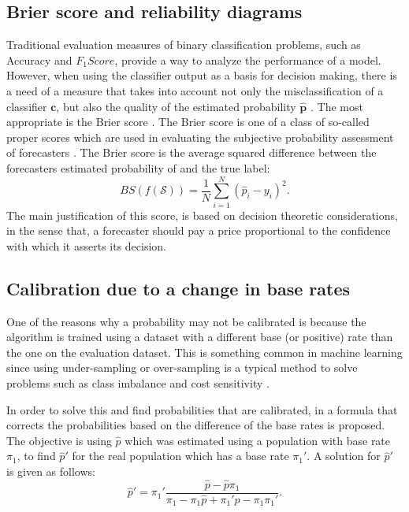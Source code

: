   
\subsection{Brier score and reliability diagrams}

Traditional evaluation measures of binary classification problems, such as Accuracy and 
$F_1Score$, provide a way to analyze the performance of a model. However, when using the classifier 
output as a basis for decision making, there is a need of a measure that takes into account not only 
the misclassification of a classifier $\mathbf{c}$, but also the quality of the estimated 
probability $\mathbf{\hat p}$ \citep{cohen2004}. The most appropriate  is the Brier score 
\citep{brier1950}. The Brier score is one of a class of so-called proper scores which are used in 
evaluating the subjective probability assessment of forecasters \citep{DeGroot1983}. The Brier score 
is the average squared difference between the forecasters estimated probability of and the true 
label:
\begin{equation}
  BS(f(\mathcal{S})) = \frac{1}{N} \sum_{i=1}^{N} (\hat p_i - y_i)^2.
\end{equation}
The main justification of this score, is based on decision theoretic considerations, in the sense 
that, a forecaster should pay a price proportional to the confidence with which it asserts its 
decision.


\subsection{Calibration due to a change in base rates}

One of the reasons why a probability may not be calibrated is because the algorithm is trained using 
a dataset with a different base (or positive) rate than the one on the evaluation dataset.  This is 
something common in machine learning since using under-sampling or over-sampling is a typical method 
to solve problems such as class imbalance and cost sensitivity \citep{Hulse2007}.
  
In order to solve this and find probabilities that are calibrated, in \citep{Elkan2001} a formula  
that corrects the probabilities based on the difference of the base rates is proposed.  The 
objective is using $\hat p$ which was estimated using a population with base rate $\pi_1$,
to find $\hat p'$ for the real population which has a base rate $\pi_1'$. A solution for $\hat p'$ 
is given as follows:
\begin{equation}
  \hat p'=\pi_1' \frac{\hat p - \hat p \pi_1}{\pi_1- \pi_1 \hat p +\pi_1' \hat p - \pi_1 \pi_1'}.
\end{equation}

